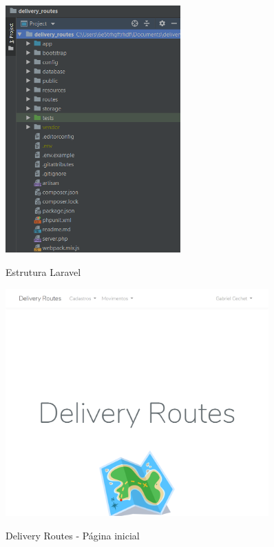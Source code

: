 \begin{figure}[H]
    \centering
    \caption{Estrutura Laravel}
    \includegraphics[width=0.6\textwidth]{./dados/figuras/fig6}
    \label{fig:base-projeto}
\end{figure}

\begin{figure}[H]
    \centering
    \caption{Delivery Routes - Página inicial}
    \includegraphics[width=0.9\textwidth]{./dados/figuras/fig7}
    \label{fig:apphome}
\end{figure}

